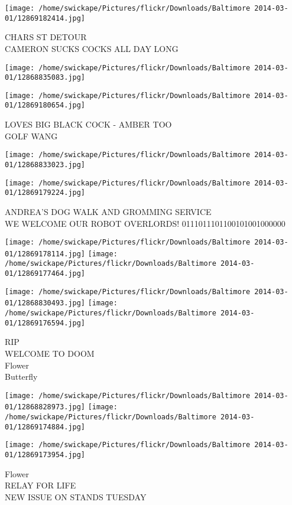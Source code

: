 \documentclass[10pt,letterpaper]{article}
\begin{document}
\vspace{0.25in}
\texttt{[image: /home/swickape/Pictures/flickr/Downloads/Baltimore 2014-03-01/12869182414.jpg]}

CHARS ST DETOUR\\
CAMERON SUCKS COCKS ALL DAY LONG\\
\pagebreak

\texttt{[image: /home/swickape/Pictures/flickr/Downloads/Baltimore 2014-03-01/12868835083.jpg]}

\vspace{0.25in}
\texttt{[image: /home/swickape/Pictures/flickr/Downloads/Baltimore 2014-03-01/12869180654.jpg]}

LOVES BIG BLACK COCK {-} AMBER TOO\\
GOLF WANG\\
\pagebreak

\texttt{[image: /home/swickape/Pictures/flickr/Downloads/Baltimore 2014-03-01/12868833023.jpg]}

\vspace{0.25in}
\texttt{[image: /home/swickape/Pictures/flickr/Downloads/Baltimore 2014-03-01/12869179224.jpg]}

ANDREA'S DOG WALK AND GROMMING SERVICE\\
WE WELCOME OUR ROBOT OVERLORDS!  0111011101100101001000000\\
\pagebreak

\texttt{[image: /home/swickape/Pictures/flickr/Downloads/Baltimore 2014-03-01/12869178114.jpg]}
\texttt{[image: /home/swickape/Pictures/flickr/Downloads/Baltimore 2014-03-01/12869177464.jpg]}

\texttt{[image: /home/swickape/Pictures/flickr/Downloads/Baltimore 2014-03-01/12868830493.jpg]}
\texttt{[image: /home/swickape/Pictures/flickr/Downloads/Baltimore 2014-03-01/12869176594.jpg]}

RIP\\
WELCOME TO DOOM\\
Flower\\
Butterfly\\
\pagebreak

\texttt{[image: /home/swickape/Pictures/flickr/Downloads/Baltimore 2014-03-01/12868828973.jpg]}
\texttt{[image: /home/swickape/Pictures/flickr/Downloads/Baltimore 2014-03-01/12869174884.jpg]}

\texttt{[image: /home/swickape/Pictures/flickr/Downloads/Baltimore 2014-03-01/12869173954.jpg]}

Flower\\
RELAY FOR LIFE\\
NEW ISSUE ON STANDS TUESDAY\\
\pagebreak
\end{document}
